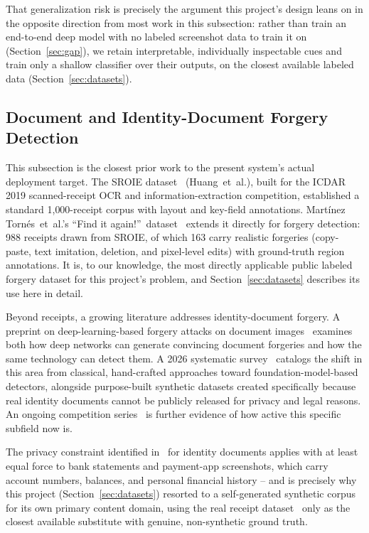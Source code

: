 \documentclass[conference]{IEEEtran}
\begin{document}
That generalization risk is precisely the argument this project's design
leans on in the opposite direction from most work in this subsection: rather
than train an end-to-end deep model with no labeled screenshot data to train
it on (Section~\ref{sec:gap}), we retain interpretable, individually
inspectable cues and train only a shallow classifier over their outputs, on
the closest available labeled data (Section~\ref{sec:datasets}).

\subsection{Document and Identity-Document Forgery Detection}
\label{sec:related-docs}
This subsection is the closest prior work to the present system's actual
deployment target. The SROIE dataset~\cite{huang2019icdar} (Huang~et~al.),
built for the ICDAR 2019 scanned-receipt OCR and information-extraction
competition, established a standard 1{,}000-receipt corpus with layout and
key-field annotations. Mart\'{i}nez Torn\'{e}s~et~al.'s ``Find it
again!''~dataset~\cite{martineztornes2023receipt} extends it directly for
forgery detection: 988 receipts drawn from SROIE, of which 163 carry
realistic forgeries (copy-paste, text imitation, deletion, and pixel-level
edits) with ground-truth region annotations. It is, to our knowledge, the
most directly applicable public labeled forgery dataset for this project's
problem, and Section~\ref{sec:datasets} describes its use here in detail.

Beyond receipts, a growing literature addresses identity-document forgery. A
preprint on deep-learning-based forgery attacks on document
images~\cite{anon2021forgery} examines both how deep networks can generate
convincing document forgeries and how the same technology can detect them. A
2026 systematic survey~\cite{anon2026survey} catalogs the shift in this area
from classical, hand-crafted approaches toward foundation-model-based
detectors, alongside purpose-built synthetic datasets created specifically
because real identity documents cannot be publicly released for privacy and
legal reasons. An ongoing competition series~\cite{anon2026competition} is
further evidence of how active this specific subfield now is.

The privacy constraint identified in~\cite{anon2026survey} for identity
documents applies with at least equal force to bank statements and
payment-app screenshots, which carry account numbers, balances, and personal
financial history -- and is precisely why this project
(Section~\ref{sec:datasets}) resorted to a self-generated synthetic corpus
for its own primary content domain, using the real receipt
dataset~\cite{martineztornes2023receipt} only as the closest available
substitute with genuine, non-synthetic ground truth.
\end{document}
